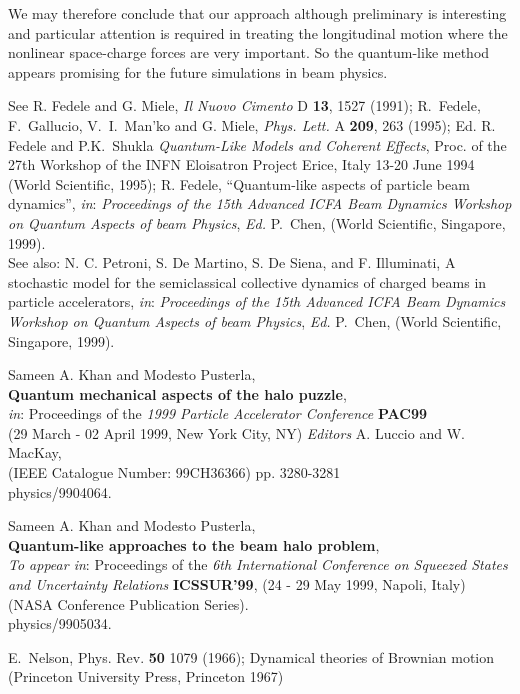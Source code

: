 \documentclass[]{article}
\begin{document}
We may therefore conclude that our approach although preliminary is
interesting and particular attention is required in treating the
longitudinal motion where the nonlinear space-charge forces are very
important. So the quantum-like method appears promising for the future 
simulations in beam physics.

\begin{thebibliography}{99}

See R. Fedele and G. Miele, 
{\em Il Nuovo Cimento} D {\bf 13},  1527 (1991);
R.~Fedele, F.~Gallucio, V.~I.~Man'ko and G. Miele, 
{\em Phys. Lett.} A {\bf 209}, 263 (1995);
Ed. R. Fedele and P.K.~Shukla
{\em Quantum-Like Models and Coherent Effects},
Proc. of the 27th Workshop of the INFN Eloisatron Project
Erice, Italy 13-20 June 1994 (World Scientific, 1995);
R. Fedele, 
``Quantum-like aspects of particle beam dynamics'', 
{\em in}: {\em Proceedings of the 15th Advanced ICFA Beam Dynamics
Workshop on Quantum Aspects of beam Physics},
{\em Ed.} P.~Chen, (World Scientific, Singapore, 1999).\\
See also:
N. C. Petroni, S. De Martino, S. De Siena, and F. Illuminati,
A stochastic model for the semiclassical collective dynamics of charged 
beams in particle accelerators,
{\em in}: {\em Proceedings of the 15th Advanced ICFA Beam Dynamics
Workshop on Quantum Aspects of beam Physics},
{\em Ed.} P.~Chen, (World Scientific, Singapore, 1999).


Sameen A. Khan and Modesto Pusterla, \\
{\bf Quantum mechanical aspects of the halo puzzle}, \\
{\em in}: Proceedings of the 
{\em 1999 Particle Accelerator Conference} {\bf PAC99} \\
(29 March - 02 April 1999, New York City, NY)
{\em Editors} A. Luccio and W. MacKay, \\
(IEEE Catalogue Number: 99CH36366) pp. 3280-3281 \\
physics/9904064.

Sameen A. Khan and Modesto Pusterla, \\
{\bf Quantum-like approaches to the beam halo problem}, \\
{\em To appear in}: Proceedings of the 
{\em 6th International Conference on Squeezed States and Uncertainty 
Relations} {\bf ICSSUR'99},
(24 - 29 May 1999, Napoli, Italy)
(NASA Conference Publication Series). \\
physics/9905034.


E.~Nelson,
Phys. Rev. {\bf 50} 1079 (1966);
Dynamical theories of Brownian motion
(Princeton University Press, Princeton 1967)


\end{thebibliography}
\end{document}
